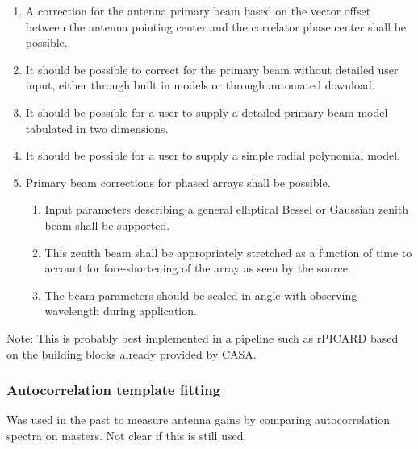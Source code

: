 \documentclass[11pt,a4paper]{article}
\begin{document}
\begin{enumerate}[subsubseclist]

\item A correction for the antenna primary beam based on the vector
  offset between the antenna pointing center and the correlator phase
  center shall be possible.

\item It should be possible to correct for the primary beam without
  detailed user input, either through built in models or through
  automated download.

\item It should be possible for a user to supply a detailed primary
  beam model tabulated in two dimensions.

\item It should be possible for a user to supply a simple radial
  polynomial model.

\item Primary beam corrections for phased arrays shall be possible.

  \begin{enumerate}[subsubsecsublist]

  \item Input parameters describing a general elliptical Bessel
    or Gaussian zenith beam shall be supported.

  \item This zenith beam shall be appropriately stretched as a
    function of time to account for fore-shortening of the array as seen by the source.

  \item The beam parameters should be scaled in angle with observing
    wavelength during application.

  \end{enumerate}

\end{enumerate}

Note: This is probably best implemented in a pipeline such as rPICARD
based on the building blocks already provided by CASA.

\subsubsection{Autocorrelation template fitting}

Was used in the past to measure antenna gains by comparing
autocorrelation spectra on masters.  Not clear if this is still used.
\end{document}
